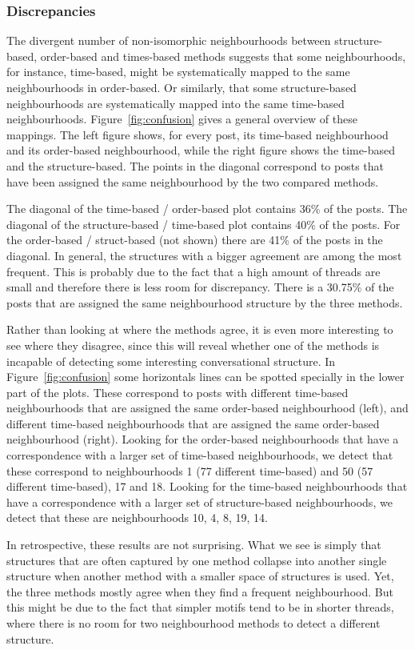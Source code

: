 \documentclass[conference]{IEEEtran}
\begin{document}
\subsubsection{Discrepancies}
The divergent number of non-isomorphic neighbourhoods between structure-based, order-based and times-based methods suggests that some neighbourhoods, for instance, time-based, might be systematically mapped to the same neighbourhoods in order-based. Or similarly, that some structure-based neighbourhoods are systematically mapped into the same time-based neighbourhoods. Figure~\ref{fig:confusion} gives a general overview of these mappings. The left figure shows, for every post, its time-based neighbourhood and its order-based neighbourhood, while the right figure shows the time-based and the structure-based. The points in the diagonal correspond to posts that have been assigned the same neighbourhood by the two compared methods. 

The diagonal of the time-based / order-based plot contains 36\% of the posts. The diagonal of the structure-based / time-based plot contains 40\% of the posts. For the order-based / struct-based (not shown) there are 41\% of the posts in the diagonal. In general, the structures with a bigger agreement are among the most frequent. This is probably due to the fact that a high amount of threads are small and therefore there is less room for discrepancy. There is a 30.75\% of the posts that are assigned the same neighbourhood structure by the three methods. 

Rather than looking at where the methods agree, it is even more interesting to see where they disagree, since this will reveal whether one of the methods is incapable of detecting some interesting conversational structure. In Figure~\ref{fig:confusion} some horizontals lines can be spotted specially in the lower part of the plots. These correspond to posts with different time-based neighbourhoods that are assigned the same order-based neighbourhood (left), and different time-based neighbourhoods that are assigned the same order-based neighbourhood (right). Looking for the order-based neighbourhoods that have a correspondence with a larger set of time-based neighbourhoods, we detect that these correspond to neighbourhoods 1 (77 different time-based) and 50 (57 different time-based), 17 and 18. Looking for the time-based neighbourhoods that have a correspondence with a larger set of structure-based neighbourhoods, we detect that these are neighbourhoods 10, 4, 8, 19, 14.

In retrospective, these results are not surprising. What we see is simply that structures that are often captured by one method collapse into another single structure when another method with a smaller space of structures is used. Yet, the three methods mostly agree when they find a frequent neighbourhood. But this might be due to the fact that simpler motifs tend to be in shorter threads, where there is no room for two neighbourhood methods to detect a different structure.
\end{document}
